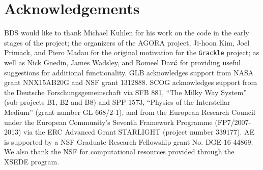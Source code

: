 \section*{Acknowledgements}

BDS would like to thank Michael Kuhlen for his work on the code in the
early stages of the project; the organizers of the AGORA project, Ji-hoon
Kim, Joel Primack, and Piero Madau for the original motivation for the
\texttt{Grackle} project; as well as Nick Gnedin, James Wadsley, and
Romeel Dav$\acute{\rm e}$ for providing useful suggestions for
additional functionality.  GLB acknowledges support from
NASA grant NNX15AB20G and NSF grant 1312888. SCOG acknowledges support
from the Deutsche Forschungsgemeinschaft via SFB 881, ``The Milky Way System'' 
(sub-projects B1, B2 and B8) and SPP 1573, ``Physics of the Interstellar Medium'' 
(grant number GL 668/2-1), and from the European Research Council under the 
European Community's Seventh Framework Programme (FP7/2007-2013) via the ERC 
Advanced Grant STARLIGHT (project number 339177). AE is supported by a NSF Graduate
Research Fellowship grant No. DGE-16-44869. We also thank the NSF for computational
resources provided through the XSEDE program.
